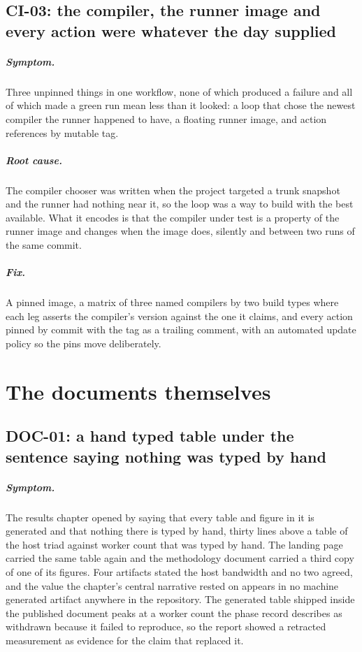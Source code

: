 \documentclass[11pt,a4paper]{report}
\newcommand{\symptom}[1]{\paragraph{Symptom.}#1}
\newcommand{\rootcause}[1]{\paragraph{Root cause.}#1}
\newcommand{\fix}[1]{\paragraph{Fix.}#1}
\begin{document}
\section{CI-03: the compiler, the runner image and every action were whatever the day supplied}

\symptom{Three unpinned things in one workflow, none of which produced a failure
and all of which made a green run mean less than it looked: a loop that chose the
newest compiler the runner happened to have, a floating runner image, and action
references by mutable tag.}

\rootcause{The compiler chooser was written when the project targeted a trunk
snapshot and the runner had nothing near it, so the loop was a way to build with
the best available. What it encodes is that the compiler under test is a property
of the runner image and changes when the image does, silently and between two
runs of the same commit.}

\fix{A pinned image, a matrix of three named compilers by two build types where
each leg asserts the compiler's version against the one it claims, and every
action pinned by commit with the tag as a trailing comment, with an automated
update policy so the pins move deliberately.}

\chapter{The documents themselves}

\section{DOC-01: a hand typed table under the sentence saying nothing was typed by hand}

\symptom{The results chapter opened by saying that every table and figure in it
is generated and that nothing there is typed by hand, thirty lines above a table
of the host triad against worker count that was typed by hand. The landing page
carried the same table again and the methodology document carried a third copy of
one of its figures. Four artifacts stated the host bandwidth and no two agreed,
and the value the chapter's central narrative rested on appears in no machine
generated artifact anywhere in the repository. The generated table shipped inside
the published document peaks at a worker count the phase record describes as
withdrawn because it failed to reproduce, so the report showed a retracted
measurement as evidence for the claim that replaced it.}
\end{document}
